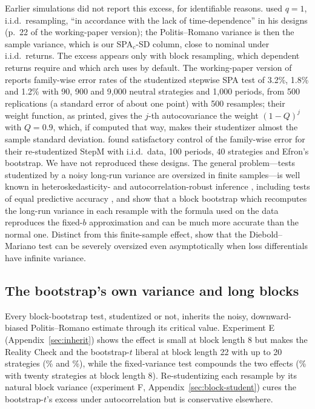 Earlier simulations did not report this excess, for identifiable reasons. \citet{hansen2005spa} used $q=1$, i.i.d.\ resampling, ``in accordance with the lack of time-dependence'' in his designs (p.~22 of the working-paper version); the Politis--Romano variance is then the sample variance, which is our SPA$_c$-SD column, close to nominal under i.i.d.\ returns. The excess appears only with block resampling, which dependent returns require and which arch uses by default. The working-paper version of \citet{hsu2010stepwise} reports family-wise error rates of the studentized stepwise SPA test of 3.2\%, 1.8\% and 1.2\% with 90, 900 and 9,000 neutral strategies and 1,000 periods, from 500 replications (a standard error of about one point) with 500 resamples; their weight function, as printed, gives the $j$-th autocovariance the weight $(1-Q)^j$ with $Q=0.9$, which, if computed that way, makes their studentizer almost the sample standard deviation. \citet{romano2005stepwise} found satisfactory control of the family-wise error for their re-studentized StepM with i.i.d.\ data, 100 periods, 40 strategies and Efron's bootstrap. We have not reproduced these designs. The general problem---tests studentized by a noisy long-run variance are oversized in finite samples---is well known in heteroskedasticity- and autocorrelation-robust inference \citep{kiefer2005new,sun2008optimal,lazarus2018har}, including tests of equal predictive accuracy \citep{coroneo2020comparing}, and \citet{goncalves2011block} show that a block bootstrap which recomputes the long-run variance in each resample with the formula used on the data reproduces the fixed-$b$ approximation and can be much more accurate than the normal one. Distinct from this finite-sample effect, \citet{frederiksen2026heavy} show that the Diebold--Mariano test can be severely oversized even asymptotically when loss differentials have infinite variance.

\subsection{The bootstrap's own variance and long blocks}
Every block-bootstrap test, studentized or not, inherits the noisy, downward-biased Politis--Romano estimate through its critical value. Experiment E (Appendix~\ref{sec:inherit}) shows the effect is small at block length 8 but makes the Reality Check and the bootstrap-$t$ liberal at block length 22 with up to 20 strategies (\% and \%), while the fixed-variance test compounds the two effects (\% with twenty strategies at block length 8). Re-studentizing each resample by its natural block variance (experiment F, Appendix~\ref{sec:block-student}) cures the bootstrap-$t$'s excess under autocorrelation but is conservative elsewhere.

